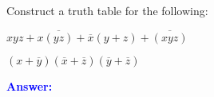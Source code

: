 \item{}
Construct a truth table for the following:
\begin{list}{\textbf{}}{}
    \item $xyz+x\overline{(yz)}+\overline{x}(y+z)+\overline{(xyz)}$
    \item $(x+\overline{y})(\overline{x}+\overline{z})(\overline{y}+\overline{z})$
\end{list}
\vskip12pt
\ifanswers
\textcolor{blue}{
\textbf{Answer:}\\
\begin{list}{\textbf{}}{}
\item 
\end{list}
}
\newpage
\fi

